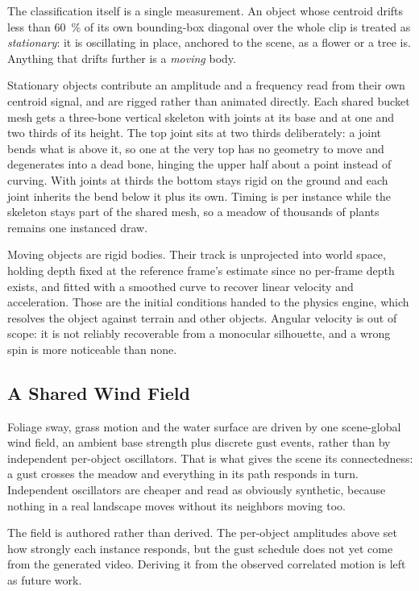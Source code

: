 The classification itself is a single measurement. An object whose centroid drifts
less than \SI{60}{\percent} of its own bounding-box diagonal over the whole clip is
treated as \emph{stationary}: it is oscillating in place, anchored to the scene, as
a flower or a tree is. Anything that drifts further is a \emph{moving} body.

Stationary objects contribute an amplitude and a frequency read from their own
centroid signal, and are rigged rather than animated directly. Each shared bucket
mesh gets a three-bone vertical skeleton with joints at its base and at one and two
thirds of its height. The top joint sits at two thirds deliberately: a joint bends
what is above it, so one at the very top has no geometry to move and degenerates
into a dead bone, hinging the upper half about a point instead of curving. With
joints at thirds the bottom stays rigid on the ground and each joint inherits the
bend below it plus its own. Timing is per instance while the skeleton stays part of
the shared mesh, so a meadow of thousands of plants remains one instanced draw.

Moving objects are rigid bodies. Their track is unprojected into world space,
holding depth fixed at the reference frame's estimate since no per-frame depth
exists, and fitted with a smoothed curve to recover linear velocity and
acceleration. Those are the initial conditions handed to the physics engine, which
resolves the object against terrain and other objects. Angular velocity is out of
scope: it is not reliably recoverable from a monocular silhouette, and a wrong spin
is more noticeable than none.

\subsection{A Shared Wind Field}
\label{sec:wind}

Foliage sway, grass motion and the water surface are driven by one scene-global
wind field, an ambient base strength plus discrete gust events, rather than by
independent per-object oscillators. That is what gives the scene its connectedness:
a gust crosses the meadow and everything in its path responds in turn. Independent
oscillators are cheaper and read as obviously synthetic, because nothing in a real
landscape moves without its neighbors moving too.

The field is authored rather than derived. The per-object amplitudes above set how
strongly each instance responds, but the gust schedule does not yet come from the
generated video. Deriving it from the observed correlated motion is left as future
work.
